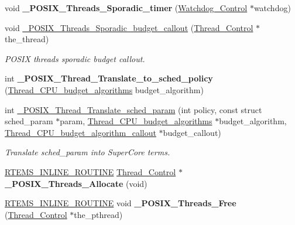 \begin{DoxyCompactItemize}
void {\bfseries \+\_\+\+P\+O\+S\+I\+X\+\_\+\+Threads\+\_\+\+Sporadic\+\_\+timer} (\mbox{\hyperlink{structWatchdog__Control}{Watchdog\+\_\+\+Control}} $\ast$watchdog)
\item 
void \mbox{\hyperlink{group__POSIX__PTHREAD_ga9e39e8f504e1f4df1f6cb8f63506453a}{\+\_\+\+P\+O\+S\+I\+X\+\_\+\+Threads\+\_\+\+Sporadic\+\_\+budget\+\_\+callout}} (\mbox{\hyperlink{struct__Thread__Control}{Thread\+\_\+\+Control}} $\ast$the\+\_\+thread)
\begin{DoxyCompactList}\small\item\em P\+O\+S\+IX threads sporadic budget callout. \end{DoxyCompactList}\item 
\mbox{\label{group__POSIX__PTHREAD_ga7a95fb7611d723582f053efef4cad33f}} 
int {\bfseries \+\_\+\+P\+O\+S\+I\+X\+\_\+\+Thread\+\_\+\+Translate\+\_\+to\+\_\+sched\+\_\+policy} (\mbox{\hyperlink{group__RTEMSScoreThread_gab6f48556812ffc781a69df144ef49be0}{Thread\+\_\+\+C\+P\+U\+\_\+budget\+\_\+algorithms}} budget\+\_\+algorithm)
\item 
int \mbox{\hyperlink{group__POSIX__PTHREAD_ga95ae6f98dd2d639ec663abc60c0e04c5}{\+\_\+\+P\+O\+S\+I\+X\+\_\+\+Thread\+\_\+\+Translate\+\_\+sched\+\_\+param}} (int policy, const struct sched\+\_\+param $\ast$param, \mbox{\hyperlink{group__RTEMSScoreThread_gab6f48556812ffc781a69df144ef49be0}{Thread\+\_\+\+C\+P\+U\+\_\+budget\+\_\+algorithms}} $\ast$budget\+\_\+algorithm, \mbox{\hyperlink{group__RTEMSScoreThread_ga2f15cbe9653e5bfcb2595454e9ffd14a}{Thread\+\_\+\+C\+P\+U\+\_\+budget\+\_\+algorithm\+\_\+callout}} $\ast$budget\+\_\+callout)
\begin{DoxyCompactList}\small\item\em Translate sched\+\_\+param into Super\+Core terms. \end{DoxyCompactList}\item 
\mbox{\label{group__POSIX__PTHREAD_ga828496f65e824c5195746460a702d29a}} 
\mbox{\hyperlink{group__RTEMSScoreBaseDefs_gac216239df231d5dbd15e3520b0b9313f}{R\+T\+E\+M\+S\+\_\+\+I\+N\+L\+I\+N\+E\+\_\+\+R\+O\+U\+T\+I\+NE}} \mbox{\hyperlink{struct__Thread__Control}{Thread\+\_\+\+Control}} $\ast$ {\bfseries \+\_\+\+P\+O\+S\+I\+X\+\_\+\+Threads\+\_\+\+Allocate} (void)
\item 
\mbox{\label{group__POSIX__PTHREAD_ga13fc7aefc1ffeab7efb2f14990498b16}} 
\mbox{\hyperlink{group__RTEMSScoreBaseDefs_gac216239df231d5dbd15e3520b0b9313f}{R\+T\+E\+M\+S\+\_\+\+I\+N\+L\+I\+N\+E\+\_\+\+R\+O\+U\+T\+I\+NE}} void {\bfseries \+\_\+\+P\+O\+S\+I\+X\+\_\+\+Threads\+\_\+\+Free} (\mbox{\hyperlink{struct__Thread__Control}{Thread\+\_\+\+Control}} $\ast$the\+\_\+pthread)
\end{DoxyCompactItemize}
